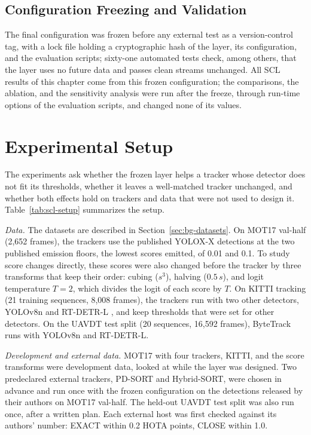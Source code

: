 \subsection{Configuration Freezing and Validation}\label{sec:scl-freeze}
The final configuration was frozen before any external test as a version-control tag, with a lock file holding a cryptographic hash of the layer, its configuration, and the evaluation scripts; sixty-one automated tests check, among others, that the layer uses no future data and passes clean streams unchanged. All SCL results of this chapter come from this frozen configuration; the comparisons, the ablation, and the sensitivity analysis were run after the freeze, through run-time options of the evaluation scripts, and changed none of its values.

\section{Experimental Setup}\label{sec:scl-setup}
The experiments ask whether the frozen layer helps a tracker whose detector does not fit its thresholds, whether it leaves a well-matched tracker unchanged, and whether both effects hold on trackers and data that were not used to design it. Table~\ref{tab:scl-setup} summarizes the setup.

\emph{Data.} The datasets are described in Section~\ref{sec:bg-datasets}. On MOT17 val-half (2,652 frames), the trackers use the published YOLOX-X detections \cite{ge2021yolox} at the two published emission floors, the lowest scores emitted, of 0.01 and 0.1. To study score changes directly, these scores were also changed before the tracker by three transforms that keep their order: cubing ($s^3$), halving ($0.5\,s$), and logit temperature $T=2$, which divides the logit of each score by $T$. On KITTI tracking (21 training sequences, 8,008 frames), the trackers run with two other detectors, YOLOv8n \cite{jocher2023yolov8} and RT-DETR-L \cite{zhao2024rtdetr}, and keep thresholds that were set for other detectors. On the UAVDT test split (20 sequences, 16,592 frames), ByteTrack runs with YOLOv8n and RT-DETR-L.

\emph{Development and external data.} MOT17 with four trackers, KITTI, and the score transforms were development data, looked at while the layer was designed. Two predeclared external trackers, PD-SORT and Hybrid-SORT, were chosen in advance and run once with the frozen configuration on the detections released by their authors on MOT17 val-half. The held-out UAVDT test split was also run once, after a written plan. Each external host was first checked against its authors' number: EXACT within 0.2 HOTA points, CLOSE within 1.0.

